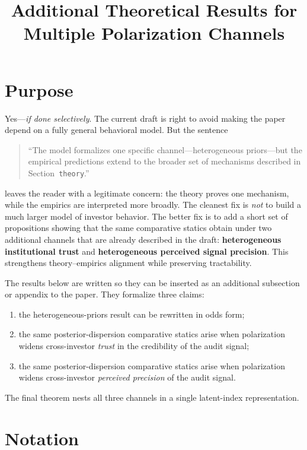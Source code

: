 \documentclass[12pt]{article}
\title{Additional Theoretical Results for Multiple Polarization Channels}
\author{}
\date{}
\begin{document}
\maketitle

\section*{Purpose}

Yes---\emph{if done selectively}. The current draft is right to avoid making the paper depend on a fully general behavioral model. But the sentence

\begin{quote}
``The model formalizes one specific channel---heterogeneous priors---but the empirical predictions extend to the broader set of mechanisms described in Section~\texttt{theory}.''
\end{quote}

leaves the reader with a legitimate concern: the theory proves one mechanism, while the empirics are interpreted more broadly. The cleanest fix is \emph{not} to build a much larger model of investor behavior. The better fix is to add a short set of propositions showing that the same comparative statics obtain under two additional channels that are already described in the draft: \textbf{heterogeneous institutional trust} and \textbf{heterogeneous perceived signal precision}. This strengthens theory--empirics alignment while preserving tractability.

The results below are written so they can be inserted as an additional subsection or appendix to the paper. They formalize three claims:
\begin{enumerate}
    \item the heterogeneous-priors result can be rewritten in odds form;
    \item the same posterior-dispersion comparative statics arise when polarization widens cross-investor \emph{trust} in the credibility of the audit signal;
    \item the same posterior-dispersion comparative statics arise when polarization widens cross-investor \emph{perceived precision} of the audit signal.
\end{enumerate}

The final theorem nests all three channels in a single latent-index representation.

\section{Notation}
\end{document}
